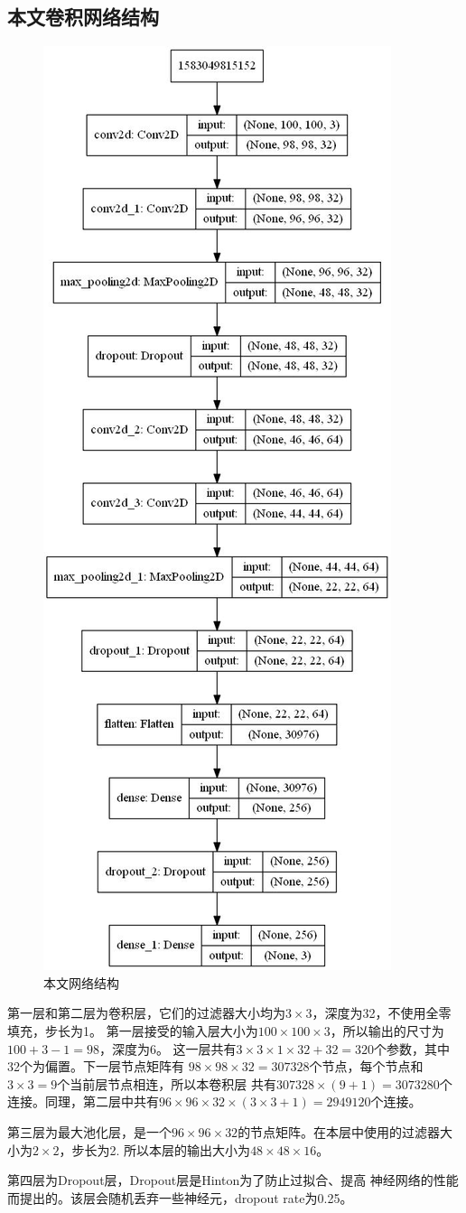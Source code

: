 \setcounter{table}{0}
\setcounter{figure}{0}

\subsection{\hei\xiaosan\textbf{本文卷积网络结构}}
  \begin{figure}[H]
    \centering
    \includegraphics[width=.4\textwidth]{resource/NewbNet.png}
    \caption{本文网络结构}
    \label{Figure.Third.1}
  \end{figure}
  第一层和第二层为卷积层，它们的过滤器大小均为$3\times3$，深度为32，不使用全零填充，步长为1。
  第一层接受的输入层大小为$100\times100\times3$，所以输出的尺寸为$100+3-1=98$，深度为6。
  这一层共有$3\times3\times1\times32+32=320$个参数，其中32个为偏置。下一层节点矩阵有
  $98\times98\times32=307328$个节点，每个节点和$3\times3=9$个当前层节点相连，所以本卷积层
  共有$307328\times(9+1)=3073280$个连接。同理，第二层中共有$96\times96\times32\times(3\times3+1)=2949120$个连接。

  第三层为最大池化层，是一个$96\times96\times32$的节点矩阵。在本层中使用的过滤器大小为$2\times2$，步长为2.
  所以本层的输出大小为$48\times48\times16$。

  第四层为Dropout层，Dropout层是Hinton\cite{hinton2012improving}为了防止过拟合、提高
  神经网络的性能而提出的。该层会随机丢弃一些神经元，dropout rate为0.25。

